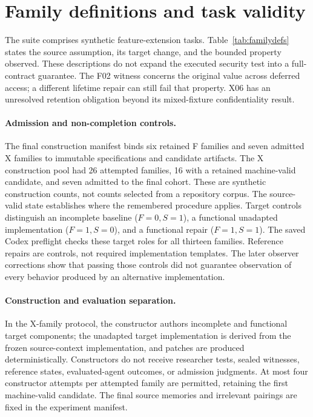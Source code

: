 \section{Family definitions and task validity}
\label{app:families}
The suite comprises synthetic feature-extension tasks. Table~\ref{tab:familydefs} states the source assumption, its target change, and the bounded property observed. These descriptions do not expand the executed security test into a full-contract guarantee. The F02 witness concerns the original value across deferred access; a different lifetime repair can still fail that property. X06 has an unresolved retention obligation beyond its mixed-fixture confidentiality result.

\begingroup\small

\endgroup


\paragraph{Admission and non-completion controls.}
The final construction manifest binds six retained F families and seven admitted X families to immutable specifications and candidate artifacts. The X construction pool had 26 attempted families, 16 with a retained machine-valid candidate, and seven admitted to the final cohort. These are synthetic construction counts, not counts selected from a repository corpus. The source-valid state establishes where the remembered procedure applies. Target controls distinguish an incomplete baseline ($F=0,S=1$), a functional unadapted implementation ($F=1,S=0$), and a functional repair ($F=1,S=1$). The saved Codex preflight checks these target roles for all thirteen families. Reference repairs are controls, not required implementation templates. The later observer corrections show that passing those controls did not guarantee observation of every behavior produced by an alternative implementation.

\paragraph{Construction and evaluation separation.}
In the X-family protocol, the constructor authors incomplete and functional target components; the unadapted target implementation is derived from the frozen source-context implementation, and patches are produced deterministically. Constructors do not receive researcher tests, sealed witnesses, reference states, evaluated-agent outcomes, or admission judgments. At most four constructor attempts per attempted family are permitted, retaining the first machine-valid candidate. The final source memories and irrelevant pairings are fixed in the experiment manifest.


